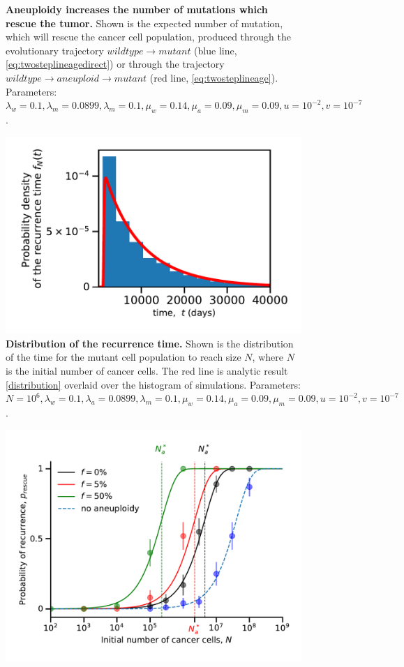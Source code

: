 \documentclass[12pt]{extarticle}
\begin{document}
\begin{appendices}
\begin{figure}
\caption{\textbf{Aneuploidy increases the number of mutations which rescue the tumor.} Shown is the expected number of mutation, which will rescue the cancer cell population, produced through the evolutionary trajectory $wildtype \rightarrow mutant$ (blue line, \cref{eq:twosteplineagedirect}) or through the trajectory $wildtype \rightarrow aneuploid \rightarrow mutant$ (red line, \cref{eq:twosteplineage}).
Parameters: $\lambda_w=0.1,\lambda_m=0.0899,\lambda_m=0.1,\mu_w=0.14,\mu_a=0.09,\mu_m=0.09, u=10^{-2}, v=10^{-7}$.}
\label{ExpectedNumberRescueLineages}
\end{figure}
\begin{figure}
\vspace*{1\baselineskip}
\includegraphics[width=1\textwidth]{Figures/KaplanMeierDistribution.pdf}
\caption{\textbf{Distribution of the recurrence time.}
Shown is the distribution of the time for the mutant cell population to reach size $N$, where $N$ is the initial number of cancer cells. The red line is analytic result \cref{distribution} overlaid over the histogram of simulations. 
Parameters: $N=10^6, \lambda_w=0.1,\lambda_a=0.0899,\lambda_m=0.1,\mu_w=0.14,\mu_a=0.09,\mu_m=0.09, u=10^{-2}, v=10^{-7}$.}
\label{KMdistribution}
\end{figure}
\begin{figure}
\includegraphics[width=1\textwidth]{Figures/ProbvN_SGV_Plot.pdf}

\end{figure}
\end{appendices}
\end{document}
